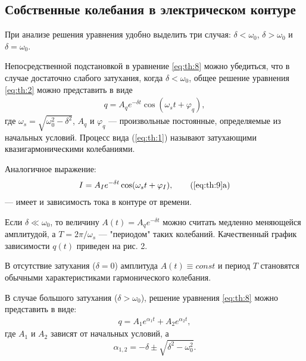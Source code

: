 \subsection{Собственные колебания в электрическом контуре}

При анализе решения уравнения  удобно выделить три случая:  
\(\delta < \omega_0\), \(\delta > \omega_0\) и \(\delta = \omega_0\).  

Непосредственной подстановкой в уравнение \cref{eq:th:8} можно убедиться, что в случае достаточно слабого затухания, когда \(\delta < \omega_0\), общее решение уравнения \cref{eq:th:2} можно представить в виде  
\begin{align} \label{eq:th:9}
	q = A_q e^{-\delta t} \cos(\omega_s t + \varphi_q),
\end{align}  
где \(\omega_s = \sqrt{\omega_0^2 - \delta^2}\), \(A_q\) и \(\varphi_q\) --- произвольные постоянные, определяемые из начальных условий. Процесс вида (\ref{eq:th:1}) называют затухающими квазигармоническими колебаниями.  

Аналогичное выражение:  
\begin{align} \label{eq:th:9a}
	I = A_I e^{-\delta t} \cos(\omega_s t + \varphi_I), \tag{\ref{eq:th:9}a}
\end{align}  
--- имеет и зависимость тока в контуре от времени.  

Если \(\delta \ll \omega_0\), то величину \(A(t) = A_q e^{-\delta t}\) можно считать медленно меняющейся амплитудой, а \(T = 2\pi / \omega_s\) --- "периодом" таких колебаний. Качественный график зависимости \(q(t)\) приведен на рис. 2.

В отсутствие затухания (\(\delta = 0\)) амплитуда \(A(t) \equiv const\) и период \(T\) становятся обычными характеристиками гармонического колебания.  

В случае большого затухания (\(\delta > \omega_0\)), решение уравнения \cref{eq:th:8} можно представить в виде:
\begin{align} \label{eq:th:10}
	q = A_1 e^{\alpha_1 t} + A_2 e^{\alpha_2 t},
\end{align}  
где \(A_1\) и \(A_2\) зависят от начальных условий, а
\[\alpha_{1, 2} = - \delta \pm \sqrt{\delta^2 - \omega_0^2}.\]



